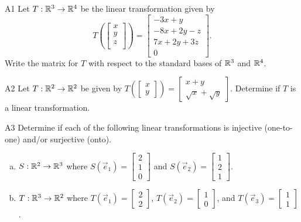 \documentclass{sbgLAexam}
\begin{document}
\begin{problem}{A1}
Let $T: \mathbb{R}^3\rightarrow \mathbb{R}^4$ be the linear transformation given by $$T\left(\begin{bmatrix} x \\ y \\ z \\  \end{bmatrix} \right) = \begin{bmatrix} -3x+y \\ -8x+2y-z \\ 7x+2y+3z \\ 0 \end{bmatrix}.$$  Write the matrix for $T$ with respect to the standard bases of $\mathbb{R}^3$ and $\mathbb{R}^4$.
\end{problem}

\begin{problem}{A2}
Let $T: \mathbb{R}^2 \rightarrow \mathbb{R}^2$ be given by $T\left(\begin{bmatrix}x \\ y  \end{bmatrix} \right) = \begin{bmatrix} x+y \\ \sqrt{x}+\sqrt{y} \end{bmatrix}$.  Determine if $T$ is a linear transformation.
\end{problem}
\newpage

\begin{problem}{A3}
Determine if each of the following linear transformations is injective (one-to-one) and/or surjective (onto).
\begin{enumerate}[(a)]
\item
  \(S: \mathbb{R}^2 \rightarrow \mathbb{R}^3\) where
  \(S(\vec e_1)=\begin{bmatrix}
    2 \\
    1 \\
    0
  \end{bmatrix}\) and
  \(S(\vec e_2)=\begin{bmatrix}
    1 \\
    2 \\
    1
  \end{bmatrix}\).
\item
  \(T: \mathbb{R}^3 \rightarrow \mathbb{R}^2\) where
  \(T(\vec e_1)=\begin{bmatrix}
    2 \\
    2
  \end{bmatrix}\),
  \(T(\vec e_2)=\begin{bmatrix}
   1  \\
   0
  \end{bmatrix}\), and
  \(T(\vec e_3)=\begin{bmatrix}
    1 \\
    1
  \end{bmatrix}\).
\end{enumerate}
\end{problem}
\end{document}

